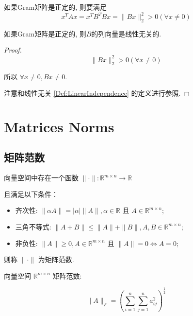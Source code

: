 \begin{theorem}
    如果Gram矩阵是正定的, 则要满足
    $$ x^{T} A x=x^{T} B^{T} B x=\|B x\|_{2}^{2}>0 ( \forall x \neq 0) $$
\end{theorem}

\begin{corollary}
    如果Gram矩阵是正定的, 则$B$的列向量是线性无关的.
\end{corollary}

\begin{proof}
    $$\|B x\|_{2}^{2}>0 ( \forall x \neq 0)$$

所以 $\forall x \neq 0, Bx \neq 0  $.

    注意和线性无关 \ref{Def:LinearIndependence} 的定义进行参照.
\end{proof}

\chapter{Matrices Norms}

\section{矩阵范数}

\begin{definition}
    向量空间中存在一个函数 $ \|\cdot\|: \mathbb{R}^{m \times n} \rightarrow \mathbb{R} $

    且满足以下条件：

    \begin{itemize}
        \item 齐次性: $ \|\alpha A\|=|\alpha|\|A\|, \alpha \in \mathbb{R} $ 且 $ A \in \mathbb{R}^{m \times n} $;
        \item 三角不等式: $ \|A+B\| \leq\|A\|+\|B\|, A, B \in \mathbb{R}^{m \times n} $;
        \item 非负性: $ \|A\| \geq 0, A \in \mathbb{R}^{m \times n} $ 且 $ \|A\|=0 \Leftrightarrow A=0 $;
    \end{itemize}

则称 $ \|\cdot\| $ 为矩阵范数. 
\end{definition}

向量空间 $ \mathbb{R}^{m \times n} $ 矩阵范数:

\begin{example}
    $$ \|A\|_{F}=\left(\sum_{i=1}^{n} \sum_{j=1}^{n} a_{i j}^{2}\right)^{\frac{1}{2}} $$
\end{example}

